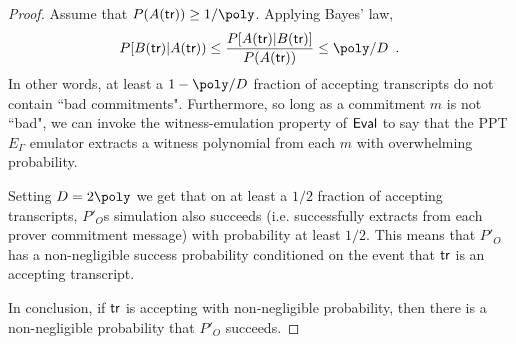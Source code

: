 \begin{proof}
Assume that $P(A(\tr)) \geq 1/\poly$. Applying Bayes' law, %
\[ P[B(\tr) | A(\tr)) \leq \frac{ P[A(\tr) | B(\tr)] }{ P(A(\tr)) } \leq \poly / D \enspace . \]
In other words, at least a $1 - \poly/D$ fraction of accepting transcripts do not contain ``bad commitments". %
Furthermore, so long as a commitment $m$ is not ``bad", we can invoke the witness-emulation property of $\textsf{{Eval}}$ to say that the PPT $E_\Gamma$ emulator extracts a witness polynomial from each $m$ with overwhelming probability.


Setting $D = 2 \poly$ we get that on at least a $1/2$ fraction of accepting transcripts, $P'_O$s simulation also succeeds (i.e. successfully extracts from each prover commitment message) with probability at least $1/2$. This means that $P'_O$ has a non-negligible success probability conditioned on the event that $\textsf{{tr}}$ is an accepting transcript. 

In conclusion, if $\textsf{{tr}}$ is accepting with non-negligible probability, then there is a non-negligible probability that $P'_O$ succeeds. 
\end{proof}


%



